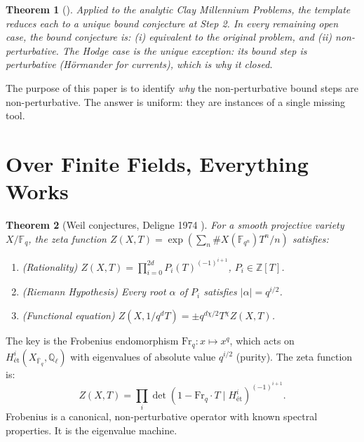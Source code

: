 \documentclass[12pt]{article}
\newtheorem{theorem}{Theorem}
\theoremstyle{definition}
\theoremstyle{remark}
\begin{document}
\begin{theorem}[\cite{hard}]\label{thm:hard}
Applied to the analytic Clay Millennium Problems, the template reduces each
to a unique bound conjecture at Step 2. In every remaining open case, the
bound conjecture is: \textup{(i)} equivalent to the original problem, and
\textup{(ii)} non-perturbative. The Hodge case is the unique exception:
its bound step is perturbative \textup{(}Hörmander for currents\textup{)},
which is why it closed.
\end{theorem}

The purpose of this paper is to identify \emph{why} the non-perturbative
bound steps are non-perturbative. The answer is uniform: they are instances
of a single missing tool.

\section{Over Finite Fields, Everything Works}

\begin{theorem}[Weil conjectures, Deligne 1974 \cite{deligne1974}]
\label{thm:weil}
For a smooth projective variety $X/\mathbb{F}_q$, the zeta function
$Z(X,T) = \exp(\sum_n \#X(\mathbb{F}_{q^n}) T^n/n)$ satisfies:
\begin{enumerate}
\item \textup{(Rationality)} $Z(X,T) = \prod_{i=0}^{2d} P_i(T)^{(-1)^{i+1}}$,
  $P_i\in\mathbb{Z}[T]$.
\item \textup{(Riemann Hypothesis)} Every root $\alpha$ of $P_i$ satisfies
  $|\alpha| = q^{i/2}$.
\item \textup{(Functional equation)} $Z(X, 1/q^d T) = \pm q^{d\chi/2} T^\chi Z(X,T)$.
\end{enumerate}
\end{theorem}

The key is the Frobenius endomorphism $\mathrm{Fr}_q: x \mapsto x^q$, which
acts on $H^i_{\text{ét}}(X_{\overline{\mathbb{F}}_q}, \mathbb{Q}_\ell)$ with
eigenvalues of absolute value $q^{i/2}$ (purity). The zeta function is:
\[
Z(X,T) = \prod_i \det(1 - \mathrm{Fr}_q \cdot T \mid H^i_{\text{ét}})^{(-1)^{i+1}}.
\]
Frobenius is a canonical, non-perturbative operator with known spectral
properties. It is the eigenvalue machine.
\end{document}
